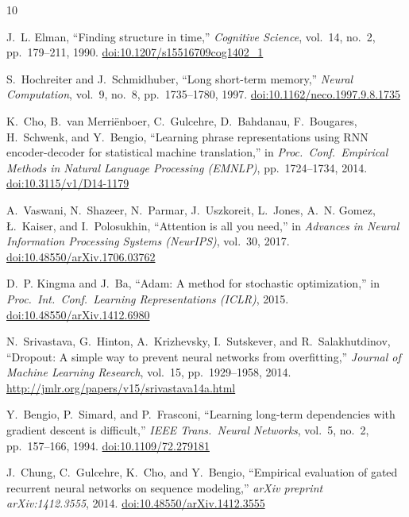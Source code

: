 \documentclass[11pt,letterpaper]{article}
\begin{document}
\begin{thebibliography}{10}

J.~L. Elman,
``Finding structure in time,''
\textit{Cognitive Science}, vol.~14, no.~2, pp.~179--211, 1990.
\href{https://doi.org/10.1207/s15516709cog1402_1}{doi:10.1207/s15516709cog1402\_1}

S.~Hochreiter and J.~Schmidhuber,
``Long short-term memory,''
\textit{Neural Computation}, vol.~9, no.~8, pp.~1735--1780, 1997.
\href{https://doi.org/10.1162/neco.1997.9.8.1735}{doi:10.1162/neco.1997.9.8.1735}

K.~Cho, B.~van Merri\"{e}nboer, C.~Gulcehre, D.~Bahdanau, F.~Bougares,
H.~Schwenk, and Y.~Bengio,
``Learning phrase representations using RNN encoder-decoder for statistical
machine translation,''
in \textit{Proc.\ Conf.\ Empirical Methods in Natural Language Processing
(EMNLP)}, pp.~1724--1734, 2014.
\href{https://doi.org/10.3115/v1/D14-1179}{doi:10.3115/v1/D14-1179}

A.~Vaswani, N.~Shazeer, N.~Parmar, J.~Uszkoreit, L.~Jones, A.~N. Gomez,
\L.~Kaiser, and I.~Polosukhin,
``Attention is all you need,''
in \textit{Advances in Neural Information Processing Systems (NeurIPS)},
vol.~30, 2017.
\href{https://doi.org/10.48550/arXiv.1706.03762}{doi:10.48550/arXiv.1706.03762}

D.~P. Kingma and J.~Ba,
``Adam: A method for stochastic optimization,''
in \textit{Proc.\ Int.\ Conf.\ Learning Representations (ICLR)}, 2015.
\href{https://doi.org/10.48550/arXiv.1412.6980}{doi:10.48550/arXiv.1412.6980}

N.~Srivastava, G.~Hinton, A.~Krizhevsky, I.~Sutskever, and R.~Salakhutdinov,
``Dropout: A simple way to prevent neural networks from overfitting,''
\textit{Journal of Machine Learning Research}, vol.~15, pp.~1929--1958, 2014.
\url{http://jmlr.org/papers/v15/srivastava14a.html}

Y.~Bengio, P.~Simard, and P.~Frasconi,
``Learning long-term dependencies with gradient descent is difficult,''
\textit{IEEE Trans.\ Neural Networks}, vol.~5, no.~2, pp.~157--166, 1994.
\href{https://doi.org/10.1109/72.279181}{doi:10.1109/72.279181}

J.~Chung, C.~Gulcehre, K.~Cho, and Y.~Bengio,
``Empirical evaluation of gated recurrent neural networks on sequence modeling,''
\textit{arXiv preprint arXiv:1412.3555}, 2014.
\href{https://doi.org/10.48550/arXiv.1412.3555}{doi:10.48550/arXiv.1412.3555}

\end{thebibliography}
\end{document}
